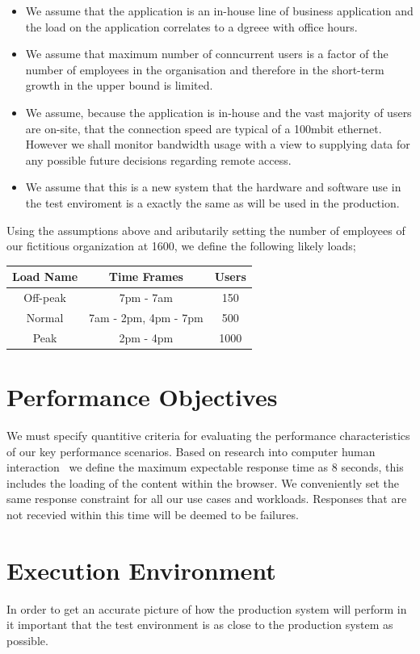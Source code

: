 \begin{itemize}
\item We assume that the application is an in-house line of business application and the load on the application correlates to a dgreee with office hours. 
\item We assume that maximum number of conncurrent users is a factor of the number of employees in the organisation and therefore in the short-term growth in the upper bound is limited. 
\item We assume, because the application is in-house and the vast majority of users are on-site, that the connection speed are typical of a 100mbit ethernet. However we shall monitor bandwidth usage with a view to supplying data for any possible future decisions regarding remote access.
\item We assume that this is a new system that the hardware and software use in the test enviroment is a exactly the same as will be used in the production.
\end{itemize}

Using the assumptions above and aributarily setting the number of employees of our fictitious organization at 1600, we define the following likely loads;

\begin{center}
\begin{tabular}{| c | c | c |}
\hline
Load Name & Time Frames & Users \\
\hline
Off-peak  & 7pm - 7am &  150 \\ 
Normal  & 7am - 2pm, 4pm - 7pm &  500 \\ 
Peak & 2pm - 4pm &  1000 \\ 
\hline
\end{tabular}
\end{center}


\section{Performance Objectives}
We must specify quantitive criteria for evaluating the performance characteristics of our key performance scenarios. Based on research into computer human interaction~\cite{Speeds} we define the maximum expectable response time as 8 seconds, this  includes the loading of the content within the browser. We conveniently set the same response constraint for all our use cases and workloads. Responses that are not recevied within this time will be deemed to be failures.

\section{Execution Environment}
In order to get an accurate picture of how the production system will perform in it important that the test environment is as close to the production system as possible. 

